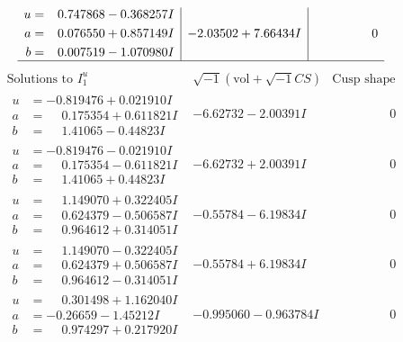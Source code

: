 \documentclass[1p]{elsarticle_modified}
\theoremstyle{definition}
\newcommand{\I}{\sqrt{-1}}
\begin{document}
$$\begin{array}{c|c|c}
\begin{aligned}
u &= \phantom{-}0.747868 - 0.368257 I \\
a &= \phantom{-}0.076550 + 0.857149 I \\
b &= \phantom{-}0.007519 - 1.070980 I\end{aligned}
 & -2.03502 + 7.66434 I & \phantom{-0.000000 } 0\\
 \hline 
 \end{array}$$\newpage$$\begin{array}{c|c|c}  
\text{Solutions to }I^u_{1}& \I (\text{vol} + \sqrt{-1}CS) & \text{Cusp shape}\\
 \hline 
\begin{aligned}
u &= -0.819476 + 0.021910 I \\
a &= \phantom{-}0.175354 + 0.611821 I \\
b &= \phantom{-}1.41065 - 0.44823 I\end{aligned}
 & -6.62732 - 2.00391 I & \phantom{-0.000000 } 0 \\ \hline\begin{aligned}
u &= -0.819476 - 0.021910 I \\
a &= \phantom{-}0.175354 - 0.611821 I \\
b &= \phantom{-}1.41065 + 0.44823 I\end{aligned}
 & -6.62732 + 2.00391 I & \phantom{-0.000000 } 0 \\ \hline\begin{aligned}
u &= \phantom{-}1.149070 + 0.322405 I \\
a &= \phantom{-}0.624379 - 0.506587 I \\
b &= \phantom{-}0.964612 + 0.314051 I\end{aligned}
 & -0.55784 - 6.19834 I & \phantom{-0.000000 } 0 \\ \hline\begin{aligned}
u &= \phantom{-}1.149070 - 0.322405 I \\
a &= \phantom{-}0.624379 + 0.506587 I \\
b &= \phantom{-}0.964612 - 0.314051 I\end{aligned}
 & -0.55784 + 6.19834 I & \phantom{-0.000000 } 0 \\ \hline\begin{aligned}
u &= \phantom{-}0.301498 + 1.162040 I \\
a &= -0.26659 - 1.45212 I \\
b &= \phantom{-}0.974297 + 0.217920 I\end{aligned}
 & -0.995060 - 0.963784 I & \phantom{-0.000000 } 0 \\ \hline\begin{aligned}

\end{aligned}
\end{array}$$
\end{document}
